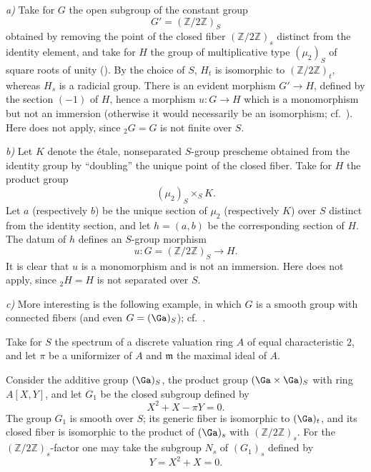 \medskip
\noindent\textit{a)} Take for \(G\) the open subgroup of the constant
group
\[
  G'=(\mathbb Z/2\mathbb Z)_S
\]
obtained by removing the point of the closed fiber
\((\mathbb Z/2\mathbb Z)_s\) distinct from the identity element, and
take for \(H\) the group of multiplicative type
\((\mu_2)_S\) of square roots of unity (). By the
choice of \(S\), \(H_t\) is isomorphic to
\((\mathbb Z/2\mathbb Z)_t\), whereas \(H_s\) is a radicial group.
There is an evident morphism \(G'\to H\), defined by the section
\((-1)\) of \(H\), hence a morphism \(u:G\to H\) which is a
monomorphism but not an immersion (otherwise it would necessarily be
an isomorphism; cf.\ ). Here  does not
apply, since \({}_{2}G=G\) is not finite over \(S\).

\medskip
\noindent\textit{b)} Let \(K\) denote the étale, nonseparated
\(S\)-group prescheme obtained from the identity group by
``doubling'' the unique point of the closed fiber. Take for \(H\) the
product group
\[
  (\mu_2)_S\times_S K.
\]
Let \(a\) (respectively \(b\)) be the unique section of \(\mu_2\)
(respectively \(K\)) over \(S\) distinct from the identity section,
and let \(h=(a,b)\) be the corresponding section of \(H\). The datum
of \(h\) defines an \(S\)-group morphism
\[
  u:G=(\mathbb Z/2\mathbb Z)_S\longrightarrow H.
\]
It is clear that \(u\) is a monomorphism and is not an immersion.
Here  does not apply, since \({}_{2}H=H\) is not
separated over \(S\).

\medskip
\noindent{}\textit{c)} More interesting is the following example, in
which \(G\) is a smooth group with connected fibers (and even
\(G=(\Ga)_S\)); cf.\ .

Take for \(S\) the spectrum of a discrete valuation ring \(A\) of
equal characteristic \(2\), and let \(\pi\) be a uniformizer of
\(A\) and \(\mathfrak m\) the maximal ideal of \(A\).

Consider the additive group \((\Ga)_S\), the product group
\((\Ga\times\Ga)_S\) with ring \(A[X,Y]\), and let \(G_1\) be the
closed subgroup defined by
\begin{equation}
  X^2+X-\pi Y=0.
  \tag{1}\label{sga3:xvi:eq:1}
\end{equation}
The group \(G_1\) is smooth over \(S\); its generic fiber is
isomorphic to \((\Ga)_t\), and its closed fiber is isomorphic to the
product of \((\Ga)_s\) with \((\mathbb Z/2\mathbb Z)_s\). For the
\((\mathbb Z/2\mathbb Z)_s\)-factor one may take the subgroup \(N_s\)
of \((G_1)_s\) defined by
\begin{equation}
  Y=X^2+X=0.
  \tag{2}\label{sga3:xvi:eq:2}
\end{equation}

